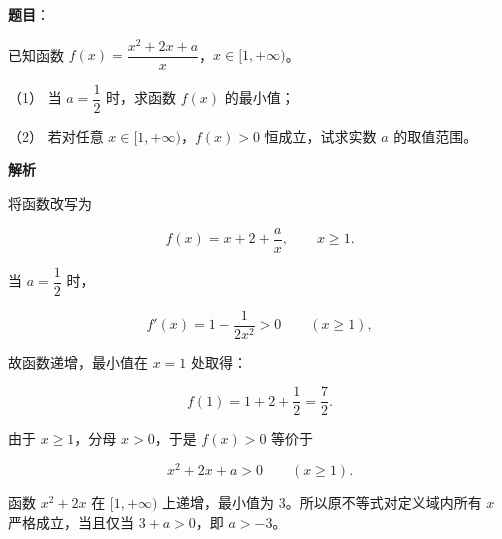 \begin{answer}

\textbf{题目}：

已知函数 $f(x)=\dfrac{x^2+2x+a}{x}$，$x\in[1,+\infty)$。

（1） 当 $a=\dfrac{1}{2}$ 时，求函数 $f(x)$ 的最小值；

（2） 若对任意 $x\in[1,+\infty)$，$f(x)>0$ 恒成立，试求实数 $a$ 的取值范围。

\textbf{解析}

将函数改写为

\nopagebreak[4]
\[
f(x)=x+2+\frac ax,\qquad x\ge1.
\]

当 $a=\dfrac12$ 时，

\nopagebreak[4]
\[
f'(x)=1-\frac{1}{2x^2}>0\qquad(x\ge1),
\]

故函数递增，最小值在 $x=1$ 处取得：

\nopagebreak[4]
\[
f(1)=1+2+\frac12=\frac72.
\]

由于 $x\ge1$，分母 $x>0$，于是 $f(x)>0$ 等价于

\nopagebreak[4]
\[
x^2+2x+a>0\qquad(x\ge1).
\]

函数 $x^2+2x$ 在 $[1,+\infty)$ 上递增，最小值为 $3$。所以原不等式对定义域内所有 $x$ 严格成立，当且仅当 $3+a>0$，即 $a>-3$。



\end{answer}
